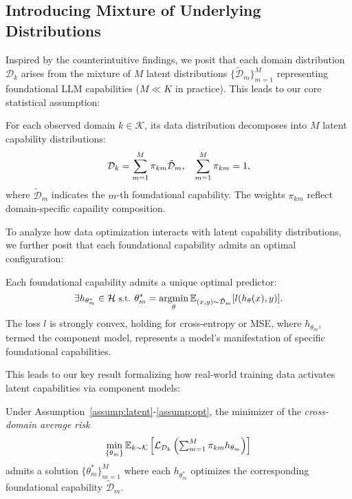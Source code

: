 \subsection{Introducing Mixture of Underlying Distributions}

Inspired by the counterintuitive findings, we posit that each domain distribution \(\mathcal{D}_k\) arises from the mixture of \(M\) latent distributions \(\{\tilde{\mathcal{D}}_m\}_{m=1}^M\) representing foundational LLM capabilities (\(M \ll K\) in practice). This leads to our core statistical assumption:

\begin{assumption}
\label{assump:latent}
For each observed domain \(k \in \mathcal{K}\), its data distribution decomposes into \(M\) latent capability distributions:
\begin{equation}
\small
    \mathcal{D}_k = \sum_{m=1}^M \pi_{km} \tilde{\mathcal{D}}_m, \quad \sum_{m=1}^M \pi_{km} = 1,
\end{equation}
where \(\tilde{\mathcal{D}}_m\) indicates the \(m\)-th foundational capability. The weights \(\pi_{km}\) reflect domain-specific capaility composition.
\end{assumption}

To analyze how data optimization interacts with latent capability distributions, we further posit that each foundational capability admits an optimal configuration:

\begin{assumption}
\label{assump:opt}
Each foundational capability admits a unique optimal predictor:
\begin{equation}
\small
    \exists h_{\theta_m^*} \in \mathcal{H} \text{ s.t. } \theta_m^* = \mathop{\mathrm{argmin}}_{\theta} \mathbb{E}_{(x,y) \sim \tilde{\mathcal{D}}_m}[l(h_\theta(x), y)].
\end{equation}
The loss \(l\) is strongly convex, holding for cross-entropy or MSE, where \(h_{\theta_m}\), termed the component model, represents a model's manifestation of specific foundational capabilities.
\end{assumption}

This leads to our key result formalizing how real-world training data activates latent capabilities via component models:

\begin{proposition}
\label{prop:latent-opt}
Under Assumption~\ref{assump:latent}-\ref{assump:opt}, the minimizer of the \textit{cross-domain average risk} 
\begin{equation}
\small
\label{eq:cross-domain-risk}
    \min_{\{\theta_m\}} \mathbb{E}_{k \sim \mathcal{K}} \left[ \mathcal{L}_{\mathcal{D}_k}\left( \textstyle\sum_{m=1}^M \pi_{km} h_{\theta_m} \right) \right]
\end{equation}
admits a solution \(\{ \theta_m^* \}_{m=1}^M\) where each \(h_{\theta_m^*}\) optimizes the corresponding foundational capability \(\tilde{\mathcal{D}}_m\). 
\end{proposition}

